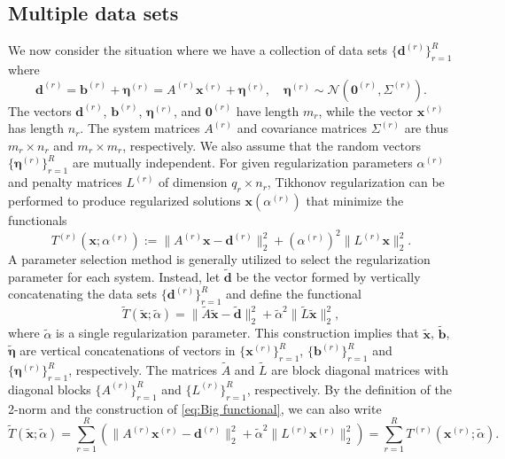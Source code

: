 \documentclass[12pt]{article}
\newcommand{\bVec}{\mathbf{b}}	%
\newcommand{\dVec}{\mathbf{d}}	%
\newcommand{\xVec}{\mathbf{x}}	%
\newcommand{\regparam}{\alpha}  %
\newcommand{\xBig}{\widetilde{\xVec}}	%
\newcommand{\bBig}{\widetilde{\bVec}}	%
\newcommand{\dBig}{\widetilde{\dVec}}	%
\newcommand{\ABig}{\widetilde{A}}	%
\newcommand{\LBig}{\widetilde{L}}	%
\newcommand{\noise}{\eta}	%
\newcommand{\noiseVec}{\bm{\noise}}	%
\newcommand{\zeroVec}{\bm{0}}	%
\begin{document}
\subsection{Multiple data sets} \label{sec:Multiple data sets}
We now consider the situation where we have a collection of data sets $\{\dVec^{(r)}\}_{r=1}^R$ where 
\begin{equation}
\label{eq:Big vectors}
\dVec^{(r)} = \bVec^{(r)} + \noiseVec^{(r)} = {A^{(r)}}\xVec^{(r)} + \noiseVec^{(r)}, \quad \noiseVec^{(r)} \sim \mathcal{N}(\bm{0}^{(r)},\Sigma^{(r)}).
\end{equation}
The vectors $\dVec^{(r)}$, $\bVec^{(r)}$, $\noiseVec^{(r)}$, and $\zeroVec^{(r)}$ have length $m_r$, while the vector $\xVec^{(r)}$ has length $n_r$. The system matrices $A^{(r)}$ and covariance matrices $\Sigma^{(r)}$ are thus $m_r \times n_r$ and $m_r \times m_r$, respectively. We also assume that the random vectors $\{\noiseVec^{(r)}\}_{r=1}^R$ are mutually independent. For given regularization parameters $\regparam^{(r)}$ and penalty matrices $L^{(r)}$ of dimension $q_r \times n_r$, Tikhonov regularization can be performed to produce regularized solutions $\xVec(\regparam^{(r)})$ that minimize the functionals
\begin{equation}
T^{(r)}(\xVec;\regparam^{(r)}) := \|A^{(r)}\xVec - \dVec^{(r)}\|_2^2 + \left(\regparam^{(r)}\right)^2\|L^{(r)}\xVec\|_2^2.
\end{equation}
A parameter selection method is generally utilized to select the regularization parameter for each system. Instead, let $\dBig$ be the vector formed by vertically concatenating the data sets $\{\dVec^{(r)}\}_{r=1}^R$ and define the functional
\begin{equation}
\label{eq:Big functional}
\widetilde{T}\left(\widetilde{\xVec};\widetilde{\regparam}\right) = \|\ABig\widetilde{\xVec} - \widetilde{\dVec}\|_2^2 + \widetilde{\regparam}^2\|\widetilde{L}\widetilde{\xVec}\|_2^2,
\end{equation}
where $\widetilde{\regparam}$ is a single regularization parameter. This construction implies that $\xBig$, $\bBig$, $\widetilde{\noiseVec}$ are vertical concatenations of vectors in $\{\xVec^{(r)}\}_{r=1}^R$, $\{\bVec^{(r)}\}_{r=1}^R$ and $\{\noiseVec^{(r)}\}_{r=1}^R$, respectively. The matrices $\ABig$ and $\LBig$ are block diagonal matrices with diagonal blocks $\{A^{(r)}\}_{r=1}^R$ and $\{L^{(r)}\}_{r=1}^R$, respectively. By the definition of the 2-norm and the construction of \eqref{eq:Big functional}, we can also write
\begin{equation}
\label{eq:Big functional 2}
\widetilde{T}\left(\xBig;\widetilde{\regparam}\right) = \sum_{r=1}^R \left(\|A^{(r)}\xVec^{(r)} - \dVec^{(r)}\|_2^2 + \widetilde{\regparam}^2\|L^{(r)} \xVec^{(r)}\|_2^2\right) = \sum_{r=1}^R T^{(r)}\left(\xVec^{(r)};\widetilde{\regparam}\right).
\end{equation}
\end{document}
